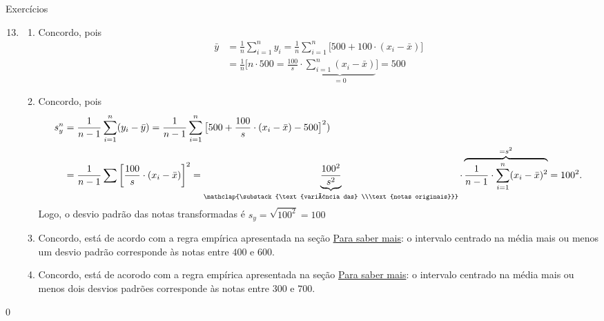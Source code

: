 \begin{answer}{Exercícios}
{\exerciselist
  \begin{enumerate}\setcounter{enumi}{12}
  \item   
  \begin{enumerate}
  \item Concordo, pois
  \begin{align*}
  \bar{y}&=\frac{1}{n}\sum^{n}_{i=1}y_i=\frac{1}{n}\sum^n_{i=1}\big[500+100\cdot(x_i-\bar{x})\big]\\
  &=\frac{1}{n}\bigg[n\cdot500=\frac{100}{s}\cdot\underbrace{\sum^n_{i=1}(x_i-\bar{x})}_{=0}\bigg]=500
  \end{align*}
  \item Concordo, pois
  \begin{align*}
  s^n_y&=\frac{1}{n-1}\sum^n_{i=1}(y_i-\bar{y})=\frac{1}{n-1}\sum^n_{i=1}\big[500+\frac{100}{s}\cdot(x_i-\bar{x})-500\big]^2)\\
  &=\frac{1}{n-1}\sum\bigg[\frac{100}{s}\cdot(x_i-\bar{x})\bigg]^2=\underbrace{\frac{100^2}{s^2}}_{\mathclap{\substack{\text{variância das} \\\text{notas originais}}}}\cdot\overbrace{\frac{1}{n-1}\cdot\sum^{n}_{i=1}(x_i-\bar{x})^2}^{=s^2}=100^2.
  \end{align*}
  Logo, o desvio padrão das notas transformadas é $s_y=\sqrt{100^2}=100$
  \item Concordo, está de acordo com a regra empírica apresentada na seção \hyperref[\detokenize{PE104-A:para-saber-mais}]{Para saber mais}: o intervalo centrado na média mais ou menos um desvio padrão corresponde às notas entre $400$ e $600$.
  \item Concordo, está de acorodo com a regra empírica apresentada na seção \hyperref[\detokenize{PE104-A:para-saber-mais}]{Para saber mais}: o intervalo centrado na média mais ou menos dois desvios padrões corresponde às notas entre $300$ e $700$.
  \end{enumerate}
  \end{enumerate}
}{0}
\end{answer}
